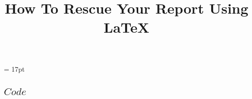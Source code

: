 \documentclass[11pt,times,oneside,openright]{eeereport}
\title{How To Rescue Your Report Using \LaTeX{}}
\subtitle{}
\begin{document}
\baselineskip = 17pt
\begin{titlepage}

\newpage
\thispagestyle{empty}
\end{titlepage}

\frontmatter

\tableofcontents
{}



\mainmatter
{}









\begin{appendices}
	\renewcommand{\thechapter}{\Alph{chapter}.}
	
    \chapter{$Code$}

\end{appendices}
\end{document}
